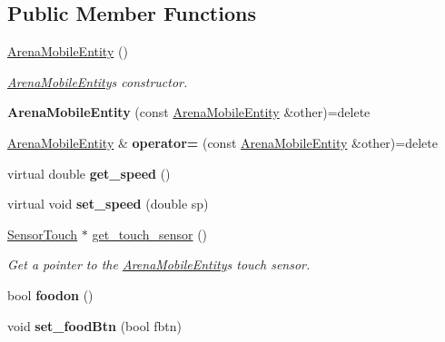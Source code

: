 \subsection*{Public Member Functions}
\begin{DoxyCompactItemize}
\item 
\mbox{\label{class_arena_mobile_entity_a6d038ac71d9b149052fc5a0fec4907f9}} 
\mbox{\hyperlink{class_arena_mobile_entity_a6d038ac71d9b149052fc5a0fec4907f9}{Arena\+Mobile\+Entity}} ()
\begin{DoxyCompactList}\small\item\em \mbox{\hyperlink{class_arena_mobile_entity}{Arena\+Mobile\+Entity}}\textquotesingle{}s constructor. \end{DoxyCompactList}\item 
\mbox{\label{class_arena_mobile_entity_ad662f3efc1a56b64ecaf5633e7ff2139}} 
{\bfseries Arena\+Mobile\+Entity} (const \mbox{\hyperlink{class_arena_mobile_entity}{Arena\+Mobile\+Entity}} \&other)=delete
\item 
\mbox{\label{class_arena_mobile_entity_a34a7f0d094515cafff7611a0f6cf4eee}} 
\mbox{\hyperlink{class_arena_mobile_entity}{Arena\+Mobile\+Entity}} \& {\bfseries operator=} (const \mbox{\hyperlink{class_arena_mobile_entity}{Arena\+Mobile\+Entity}} \&other)=delete
\item 
\mbox{\label{class_arena_mobile_entity_a2116341414a3ad0449dc03efa6ea500b}} 
virtual double {\bfseries get\+\_\+speed} ()
\item 
\mbox{\label{class_arena_mobile_entity_a1a047f4377a9557516a2e1d6d73db849}} 
virtual void {\bfseries set\+\_\+speed} (double sp)
\item 
\mbox{\label{class_arena_mobile_entity_ae9507f1b0c6bfdfd62afbab8a9a150f7}} 
\mbox{\hyperlink{class_sensor_touch}{Sensor\+Touch}} $\ast$ \mbox{\hyperlink{class_arena_mobile_entity_ae9507f1b0c6bfdfd62afbab8a9a150f7}{get\+\_\+touch\+\_\+sensor}} ()
\begin{DoxyCompactList}\small\item\em Get a pointer to the \mbox{\hyperlink{class_arena_mobile_entity}{Arena\+Mobile\+Entity}}\textquotesingle{}s touch sensor. \end{DoxyCompactList}\item 
\mbox{\label{class_arena_mobile_entity_a1c39e636ebd97600afdaf1bf1df1315f}} 
bool {\bfseries foodon} ()
\item 
\mbox{\label{class_arena_mobile_entity_ad2dd0b482ed67685585f056f248b4523}} 
void {\bfseries set\+\_\+food\+Btn} (bool fbtn)
\end{DoxyCompactItemize}
